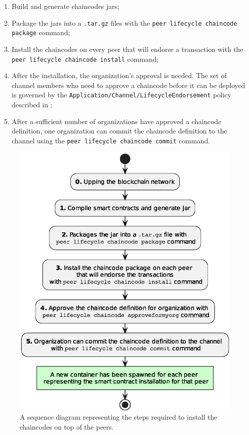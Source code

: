 \documentclass{scrartcl}
\begin{document}
\begin{enumerate}
    \item Build and generate chaincodes jars;
    \item Package the jars into a \texttt{.tar.gz} files with the \texttt{peer lifecycle chaincode package} command;
    \item Install the chaincodes on every peer that will endorse a transaction with the \texttt{peer lifecycle chaincode install} command;
    \item After the installation, the organization's approval is needed. The set of channel members who need to approve a chaincode before it can be deployed is governed by the \texttt{Application/Channel/LifecycleEndorsement} policy described in ;
    \item After a sufficient number of organizations have approved a chaincode definition, one organization can commit the chaincode definition to the channel using the \texttt{peer lifecycle chaincode commit} command.
\end{enumerate}

\begin{figure}
    \centering
    \includegraphics[width=0.7\linewidth]{figures/sc-installation-sequence.eps}
    \caption{A sequence diagram representing the steps required to install the chaincodes on top of the peers.}
    \label{fig:sc-installation-sequence.eps}
\end{figure}
\end{document}
